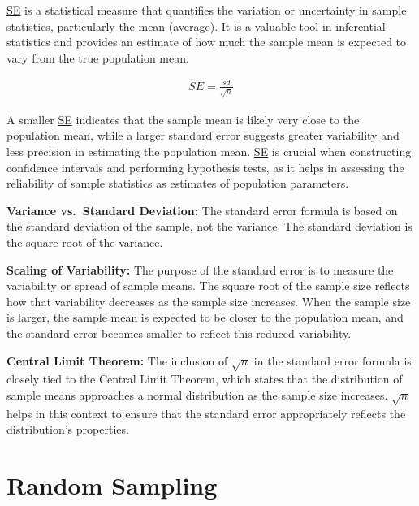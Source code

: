 \documentclass[
  a4paper,
]{scrbook}
\begin{document}
\hyperref[acronyms_SE]{SE} is a statistical measure that quantifies the
variation or uncertainty in sample statistics, particularly the mean
(average). It is a valuable tool in inferential statistics and provides
an estimate of how much the sample mean is expected to vary from the
true population mean.

\begin{align}
SE = \frac{sd}{\sqrt{n}}
\end{align}

A smaller \hyperref[acronyms_SE]{SE} indicates that the sample mean is
likely very close to the population mean, while a larger standard error
suggests greater variability and less precision in estimating the
population mean. \hyperref[acronyms_SE]{SE} is crucial when constructing
confidence intervals and performing hypothesis tests, as it helps in
assessing the reliability of sample statistics as estimates of
population parameters.

\textbf{Variance vs.~Standard Deviation:} The standard error formula is
based on the standard deviation of the sample, not the variance. The
standard deviation is the square root of the variance.

\textbf{Scaling of Variability:} The purpose of the standard error is to
measure the variability or spread of sample means. The square root of
the sample size reflects how that variability decreases as the sample
size increases. When the sample size is larger, the sample mean is
expected to be closer to the population mean, and the standard error
becomes smaller to reflect this reduced variability.

\textbf{Central Limit Theorem:} The inclusion of \(\sqrt{n}\) in the
standard error formula is closely tied to the Central Limit Theorem,
which states that the distribution of sample means approaches a normal
distribution as the sample size increases. \(\sqrt{n}\) helps in this
context to ensure that the standard error appropriately reflects the
distribution's properties.

\section{Random Sampling}\label{random-sampling}
\end{document}
